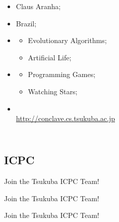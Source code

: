 \begin{frame}
\begin{columns}
    {\small
    \begin{itemize}
      \item {} Claus Aranha;
      \item {} Brazil;
      \item {}
      \begin{itemize}
        \item Evolutionary Algorithms;
        \item Artificial Life;
      \end{itemize}
      \item {}
      \begin{itemize}
        \item Programming Games;
        \item Watching Stars;
      \end{itemize}
        \medskip

      \item {}\\ {\smaller \url{http://conclave.cs.tsukuba.ac.jp}}
    \end{itemize}
    }
  \end{columns}
\end{frame}

\subsection{ICPC}
\begin{frame}{Join the Tsukuba ICPC Team!}
\end{frame}

\begin{frame}{Join the Tsukuba ICPC Team!}
\end{frame}

\begin{frame}{Join the Tsukuba ICPC Team!}
\end{frame}

%



